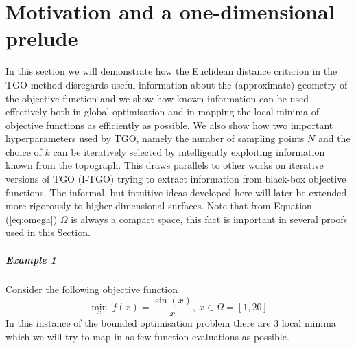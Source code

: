 \chapter{Motivation and a one-dimensional prelude} \label{sec:motivation}

In this section we will demonstrate how the Euclidean distance criterion in the TGO method disregards useful information about the (approximate) geometry of the objective function and we show how known information can be used effectively both in global optimisation and in mapping the local minima of objective functions as efficiently as possible. We also show how two important hyperparameters used by TGO, namely the number of sampling points $N$ and the choice of $k$ can be iteratively selected by intelligently exploiting information known from the topograph. This draws parallels to other works on iterative versions of TGO (I-TGO) \citep{Torn1996} trying to extract information from black-box objective functions. The informal, but intuitive ideas developed here will later be extended more rigorously to higher dimensional surfaces. Note that from Equation (\ref{eq:omega}) $\Omega$ is always a compact space, this fact is important in several proofs used in this Section. %
\paragraph{Example 1}Consider the following objective function
\begin{equation} \label{eq:test1}
\underset{x}{\min} ~f(x) = \frac{\sin(x)}{x}, ~ x \in  \Omega = [1, 20]
\end{equation}
In this instance of the bounded optimisation problem there are 3 local minima which we will try to map in as few function evaluations as possible. 

